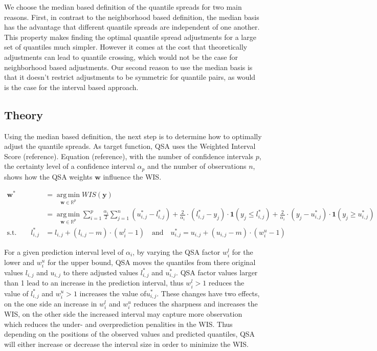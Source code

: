 \documentclass[
]{article}
\begin{document}
We choose the median based definition of the quantile spreads for two main reasons. First, in contrast to the neighborhood based definition, the median basis has the advantage that different quantile spreads are independent of one another. This property makes finding the optimal quantile spread adjustments for a large set of quantiles much simpler. However it comes at the cost that theoretically adjustments can lead to quantile crossing, which would not be the case for neighborhood based adjustments. Our second reason to use the median basis is that it doesn't restrict adjustments to be symmetric for quantile pairs, as would is the case for the interval based approach.

\hypertarget{theory}{%
\subsection{Theory}\label{theory}}

Using the median based definition, the next step is to determine how to optimally adjust the quantile spreads. As target function, QSA uses the Weighted Interval Score (reference). Equation (reference), with the number of confidence intervals \(p\), the certainty level of a confidence interval \(\alpha_{p}\) and the number of observations \(n\), shows how the QSA weights \(\mathbf{w}\) influence the WIS.

\[
\begin{aligned}
\mathbf{w}^*
&= \operatorname*{arg\,min}_{\mathbf{w} \in \mathbb{R}^p} WIS(\mathbf{y}) \\
&= \operatorname*{arg\,min}_{\mathbf{w} \in \mathbb{R}^p} \sum_{i=1}^p \frac{\alpha_{i}}{2} \sum_{j=1}^n (u_{i,j}^*-l_{i,j}^*) + \frac{2}{\alpha_{i}} \cdot (l_{i,j}^*-y_j) \cdot \mathbf{1} (y_j \leq l_{i,j}^*) + \frac{2}{\alpha_{i}} \cdot (y_j-u_{i,j}^*) \cdot \mathbf{1}(y_j \geq u_{i,j}^*) \\
\text{s.t.} \qquad l_{i,j}^* &= l_{i,j} + (l_{i,j}-m) \cdot (w_i^l-1) \quad \text{and} \quad 
u_{i,j}^* = u_{i,j} + (u_{i,j}-m) \cdot (w_i^u-1)
\end{aligned}
\]

For a given prediction interval level of \(\alpha_{i}\), by varying the QSA factor \(w_i^l\) for the lower and \(w_i^u\) for the upper bound, QSA moves the quantiles from there original values \(l_{i,j}\) and \(u_{i,j}\) to there adjusted values \(l_{i,j}^*\) and \(u_{i,j}^*\). QSA factor values larger than 1 lead to an increase in the prediction interval, thus \(w_i^l > 1\) reduces the value of \(l_{i,j}^*\) and \(w_i^u > 1\) increases the value of\(u_{i,j}^*\). These changes have two effects, on the one side an increase in \(w_i^l\) and \(w_i^u\) reduces the sharpness and increases the WIS, on the other side the increased interval may capture more observation which reduces the under- and overprediction penalities in the WIS. Thus depending on the positions of the observed values and predicted quantiles, QSA will either increase or decrease the interval size in order to minimize the WIS.
\end{document}

